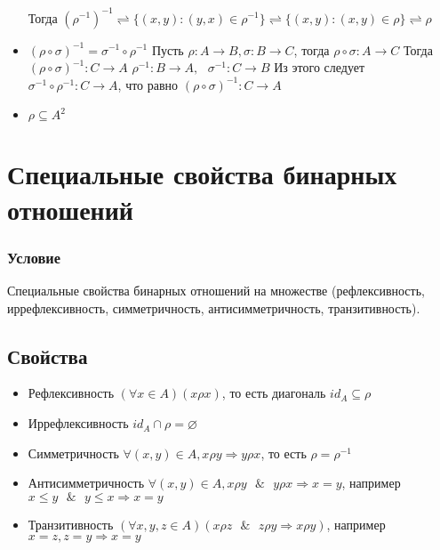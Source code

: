 \documentclass{report}
\newcommand{\band}{\mbox{ } \& \mbox{ }}
\begin{document}
\begin{itemize}
	      Тогда $(\rho^{-1})^{-1} \rightleftharpoons
		      \{(x,y): (y,x) \in \rho^{-1}\} \rightleftharpoons
		      \{(x,y): (x,y) \in \rho\} \rightleftharpoons \rho$
	\item $(\rho \circ \sigma)^{-1} = \sigma^{-1} \circ \rho^{-1}$\newline
	      Пусть $\rho: A \rightarrow B, \sigma: B \rightarrow C$, тогда $\rho \circ \sigma: A \rightarrow C$\newline
	      Тогда $(\rho \circ \sigma)^{-1}: C \rightarrow A$\newline
	      $\rho^{-1}: B \rightarrow A,\mbox{ } \sigma^{-1}: C \rightarrow B$\newline
	      Из этого следует $\sigma^{-1} \circ \rho^{-1}: C \rightarrow A$, что равно $(\rho \circ \sigma)^{-1}:C \rightarrow A$
	\item $\rho \subseteq A^{2}$



\end{itemize}
\newpage
\section{Специальные свойства бинарных отношений}
\subsubsection{Условие}
Специальные свойства бинарных отношений на множестве (рефлексивность,
иррефлексивность, симметричность, антисимметричность, транзитивность).

\subsection{Свойства}
\begin{itemize}
	\item Рефлексивность\newline
	      $(\forall x \in A)(x\rho x)$, то есть диагональ $id_A \subseteq \rho$
	\item Иррефлексивность\newline
	      $id_A \cap \rho = \varnothing$
	\item Симметричность\newline
	      $\forall (x,y) \in A, x\rho y \Rightarrow y\rho x$, то есть $\rho = \rho^{-1}$
	\item  Антисимметричность\newline
	      $\forall (x,y) \in A, x\rho y \band y\rho x \Rightarrow x = y$, например $x \leq y \band y \leq x \Rightarrow x = y$
	\item Транзитивность\newline
	      $(\forall x,y,z \in A)(x\rho z \band z\rho y \Rightarrow x\rho y)$, например $x = z, z = y \Rightarrow x = y$
\end{itemize}
\newpage
\end{document}
